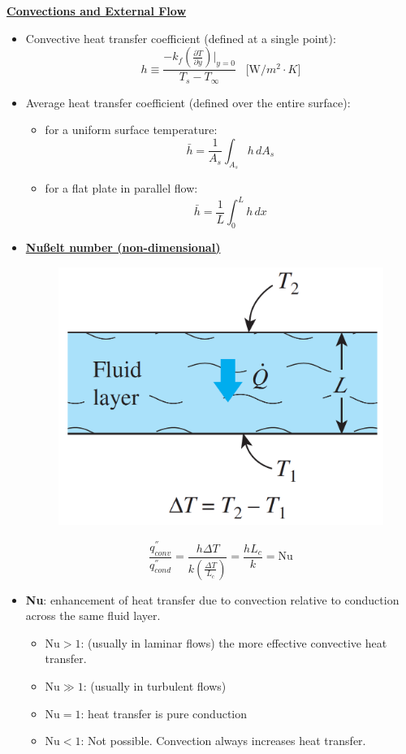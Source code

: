 \underline{\textbf{\large Convections and External Flow}}
\begin{itemize}
    \item Convective heat transfer coefficient (defined at a single point):
    \begin{equation*}
        h \equiv \frac{-k_f \left(\frac{\partial T}{\partial y}\right)|_{y=0}}{T_s - T_{\infty}} \; \; \; \text{[W/$m^2\cdot K$]}
    \end{equation*}
    \item Average heat transfer coefficient (defined over the entire surface): 
    \begin{itemize}
        \item for a uniform surface temperature:
        \begin{equation*}
            \bar{h} = \frac{1}{A_s}\int_{A_s} h \, d A_s
        \end{equation*}
        \item for a flat plate in parallel flow:
        \begin{equation*}
            \bar{h} = \frac{1}{L} \int_{0}^{L} h \, dx
        \end{equation*}
    \end{itemize}
    
    
    \item \underline{\textbf{\large Nußelt number (non-dimensional)}}
    \begin{figure}[H]
        \centering
        \includegraphics[width=0.55\linewidth]{images/Nusselt_number.png}
    \end{figure}
    \begin{equation*}
        \frac{q^{''}_{conv}}{q^{''}_{cond}} = \frac{h \Delta T}{k \left(\frac{\Delta T}{L_c}\right)} = \frac{hL_c}{k} = \text{Nu}
    \end{equation*}
    \item \textbf{Nu}: enhancement of heat transfer due to convection relative to conduction across the same fluid layer.
    \begin{itemize}
        \item $\text{Nu}>1$: (usually in laminar flows) the more effective convective heat transfer.
        \item $\text{Nu}\gg 1$: (usually in turbulent flows) 
        \item $\text{Nu}=1$: heat transfer is pure conduction
        \item $\text{Nu}<1$: Not possible. Convection always increases heat transfer.
    \end{itemize}
\end{itemize}